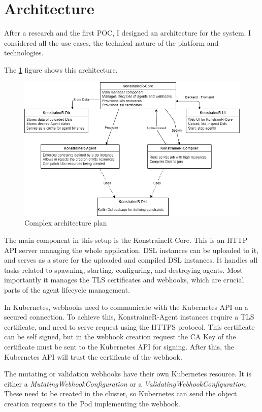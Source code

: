 \section{Architecture}

After a research and the first POC, I designed an architecture for the system. I considered all the use cases, the technical nature of the platform and technologies.

The \ref{fig:comp_arch} figure shows this architecture.

\begin{figure}[h]
    \centering
    \includegraphics[width=130mm, keepaspectratio]{content/75_archPlan/xarch.png}
    \caption{Complex architecture plan}
    \label{fig:comp_arch}
\end{figure}


The main component in this setup is the KonstraineR-Core. This is an HTTP API server managing the whole application. DSL instances can be uploaded to it, and serves as a store for the uploaded and compiled DSL instances. It handles all tasks related to spawning, starting, configuring, and destroying agents. Most importantly it manages the TLS certificates and webhooks, which are crucial parts of the agent lifecycle management.

In Kubernetes, webhooks need to communicate with the Kubernetes API on a secured connection. To achieve this, KonstraineR-Agent instances require a TLS certificate, and need to serve request using the HTTPS protocol. This certificate can be self signed, but in the webhook creation request the CA Key of the certificate must be sent to the Kubernetes API for signing. After this, the Kubernetes API will trust the certificate of the webhook.

The mutating or validation webhooks have their own Kubernetes resource. It is either a \emph{MutatingWebhookConfiguration} or a \emph{ValidatingWebhookConfiguration}. These need to be created in the cluster, so Kubernetes can send the object creation requests to the Pod implementing the webhook.

